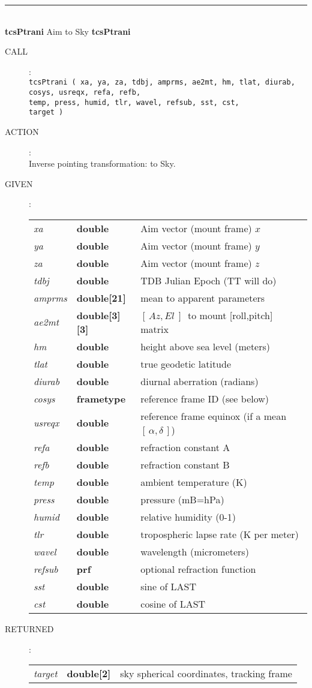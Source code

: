 \documentclass[12pt,fleqn,twoside]{article}
\renewcommand{\_}{{\tt\char'137}}     %
\newcommand{\radec}     {$[\,\alpha,\delta\,]$}
\newcommand{\azel}      {$[\,Az,El~]$}
\newcommand{\routine}[2]
{
  \newpage
  \rule{\textwidth}{0.3mm}\\ \nopagebreak
  {\Large {\bf #1} \hfill #2 \hfill {\bf #1}}
  \vspace{-1ex}
}
\newcommand{\call}[1]
{
  \goodbreak
  \begin{description}
    \item[CALL]: \\[0.5ex] \nopagebreak
        {\tt #1}
  \end{description}
  \vspace{-3ex}
}
\newcommand{\action}[1]
{
  \goodbreak
  \begin{description}
    \item[ACTION]: \\[0.5ex] \nopagebreak
        #1
  \end{description}
  \vspace{-3ex}
}
\newcommand{\args}[2]
{
  \goodbreak
  \begin{description}
  \item[#1]: \\[1.5ex] \nopagebreak
    \hspace*{-0.9em}
    \begin{tabular}{p{4.5em}p{5.8em}p{23.5em}}
      #2
    \end{tabular}
  \end{description}
  \vspace{-3ex}
}
\newcommand{\spec}[3]
{
  {\em {#1}} & {\bf \mbox{#2}} & {#3}
}
\begin{document}
\routine{tcsPtrani}{{\sc Aim} to {\sc Sky}}
\label{tcsPtrani}
\call{tcsPtrani ( xa, ya, za, tdbj, amprms, ae2mt, hm, tlat, diurab, \\
  \hspace*{5.5em} cosys, usreqx, refa, refb, \\
  \hspace*{5.5em} temp, press, humid, tlr, wavel, refsub, sst, cst, \\
  \hspace*{5.5em} target ) }
\action{Inverse pointing transformation: {} to {\sc Sky}.}
\args{GIVEN}
{
\spec{xa}{double}{{\sc Aim} vector (mount frame) $x$} \\
\spec{ya}{double}{{\sc Aim} vector (mount frame) $y$} \\
\spec{za}{double}{{\sc Aim} vector (mount frame) $z$} \\
\spec{tdbj}{double}{TDB Julian Epoch (TT will do)} \\
\spec{amprms}{double[21]}{mean to apparent parameters} \\
\spec{ae2mt}{double[3][3]}{\azel\ to mount [roll,pitch] matrix} \\
\spec{hm}{double}{height above sea level (meters)} \\
\spec{tlat}{double}{true geodetic latitude} \\
\spec{diurab}{double}{diurnal aberration (radians)} \\
\spec{cosys}{{\sc frametype}}{reference frame ID (see below)} \\
\spec{usreqx}{double}{reference frame equinox (if a mean \radec)} \\
\spec{refa}{double}{refraction constant A} \\
\spec{refb}{double}{refraction constant B} \\
\spec{temp}{double}{ambient temperature (K)} \\
\spec{press}{double}{pressure (mB=hPa)} \\
\spec{humid}{double}{relative humidity (0-1)} \\
\spec{tlr}{double}{tropospheric lapse rate (K per meter)} \\
\spec{wavel}{double}{wavelength (micrometers)} \\
\spec{refsub}{{\sc prf} }{optional refraction function} \\
\spec{sst}{double}{sine of LAST} \\
\spec{cst}{double}{cosine of LAST}
}
\args{RETURNED}
{
\spec{target}{double[2]}{sky spherical coordinates, tracking frame}
}
\end{document}
